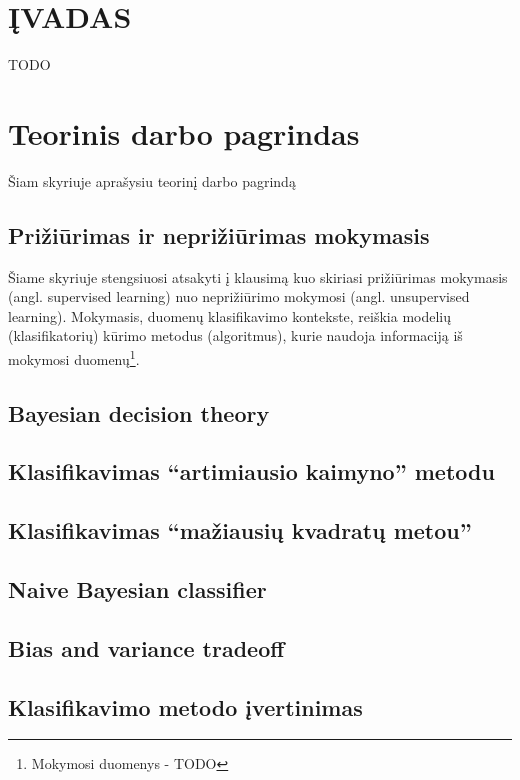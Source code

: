 \documentclass{article}
\begin{document}
\let \savenumberline \numberline
\def \numberline#1{\savenumberline{#1.}}
\tableofcontents
\newpage

\section*{ĮVADAS}
TODO
%

\section{Teorinis darbo pagrindas}
Šiam skyriuje aprašysiu teorinį darbo pagrindą \cite{greenwade93}
\subsection{Prižiūrimas ir neprižiūrimas mokymasis}
Šiame skyriuje stengsiuosi atsakyti į klausimą kuo skiriasi prižiūrimas mokymasis
(angl. supervised learning) nuo neprižiūrimo mokymosi (angl. unsupervised
learning). Mokymasis, duomenų klasifikavimo kontekste, reiškia modelių
(klasifikatorių) kūrimo metodus (algoritmus), kurie naudoja informaciją iš
mokymosi duomenų\footnote{Mokymosi duomenys - TODO}.


\subsection{Bayesian decision theory}
\subsection{Klasifikavimas ``artimiausio kaimyno'' metodu}
\subsection{Klasifikavimas ``mažiausių kvadratų metou''}
\subsection{Naive Bayesian classifier}
\subsection{Bias and variance tradeoff}
\subsection{Klasifikavimo metodo įvertinimas}
\end{document}
